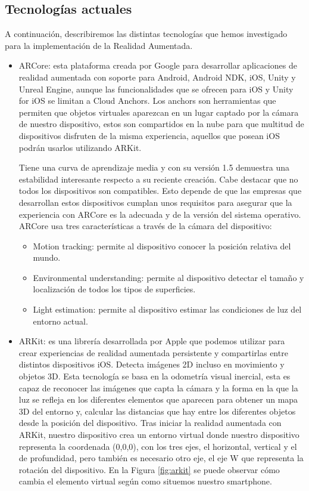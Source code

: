 \subsection{Tecnologías actuales}
\label{makereference2.1.1}
A continuación, describiremos las distintas tecnologías que hemos investigado para la implementación de la Realidad Aumentada.
\begin{itemize}
    \item ARCore\cite{arcore}: esta plataforma creada por Google para desarrollar aplicaciones de
 realidad aumentada con soporte para Android, Android NDK, iOS,
 Unity y Unreal Engine, aunque las funcionalidades que se ofrecen
 para iOS y Unity for iOS se limitan a Cloud Anchors. Los anchors
 son herramientas que permiten que objetos virtuales aparezcan en un lugar
 captado por la cámara de nuestro dispositivo, estos son compartidos
 en la nube para que multitud de dispositivos disfruten de la misma
 experiencia, aquellos que posean iOS podrán usarlos utilizando ARKit.

Tiene una curva de aprendizaje media y con su versión 1.5 demuestra una
 estabilidad interesante respecto a su reciente creación. Cabe destacar
 que no todos los dispositivos son compatibles. Esto depende de que las
 empresas que desarrollan estos dispositivos cumplan unos requisitos
 para asegurar que la experiencia con ARCore es la adecuada y de la
 versión del sistema operativo.
ARCore usa tres características a través de la cámara del dispositivo:
 \begin{itemize}  
     \item Motion tracking: permite al dispositivo conocer la posición relativa del mundo.
     \item Environmental understanding: permite al dispositivo detectar el tamaño y localización de todos los tipos de superficies.
     \item Light estimation: permite al dispositivo estimar las condiciones de luz del entorno actual.
 \end{itemize}

\item ARKit\cite{arkit}: es una librería desarrollada por Apple que podemos utilizar para crear 
experiencias de realidad aumentada persistente y compartirlas entre distintos dispositivos iOS. 
Detecta imágenes 2D incluso en movimiento y objetos 3D. Esta tecnología se basa en la odometría visual inercial, esta es capaz 
de reconocer las imágenes que capta la cámara y la forma en la que la luz se refleja 
en los diferentes elementos que aparecen para obtener un mapa 3D del entorno y, calcular las distancias que hay entre los diferentes objetos 
desde la posición del dispositivo. Tras iniciar la realidad aumentada con ARKit, nuestro dispositivo crea un entorno virtual donde nuestro
dispositivo representa la coordenada (0,0,0), con los tres ejes, el horizontal, vertical y el de profundidad, pero también es necesario otro eje,
el eje W que representa la rotación del dispositivo. En la Figura \ref{fig:arkit} se puede observar cómo cambia el elemento virtual según como situemos nuestro
smartphone.


\end{itemize}
